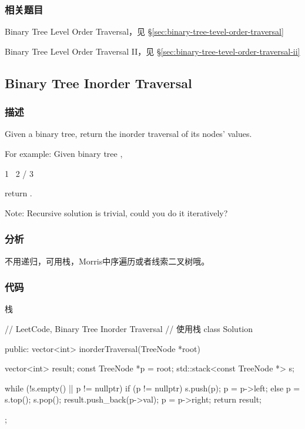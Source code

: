 \subsubsection{相关题目}
\begindot
\item Binary Tree Level Order Traversal，见 \S \ref{sec:binary-tree-tevel-order-traversal}
\item Binary Tree Level Order Traversal II，见 \S \ref{sec:binary-tree-tevel-order-traversal-ii}
\myenddot


\subsection{Binary Tree Inorder Traversal}
\label{sec:binary-tree-inorder-traversal}


\subsubsection{描述}
Given a binary tree, return the inorder traversal of its nodes' values.

For example:
Given binary tree ,
\begin{Code}
 1
  \
   2
  /
 3
\end{Code}
return \code{[1,3,2]}.

Note: Recursive solution is trivial, could you do it iteratively?


\subsubsection{分析}
不用递归，可用栈，Morris中序遍历或者线索二叉树哦。


\subsubsection{代码}

栈
\begin{Code}
// LeetCode, Binary Tree Inorder Traversal
// 使用栈
class Solution {
public:
    vector<int> inorderTraversal(TreeNode *root) {
        vector<int> result;
        const TreeNode *p = root;
        std::stack<const TreeNode *> s;

        while (!s.empty() || p != nullptr) {
            if (p != nullptr) {
                s.push(p);
                p = p->left;
            } else {
                p = s.top();
                s.pop();
                result.push_back(p->val);
                p = p->right;
            }
        }
        return result;
    }
};
\end{Code}

